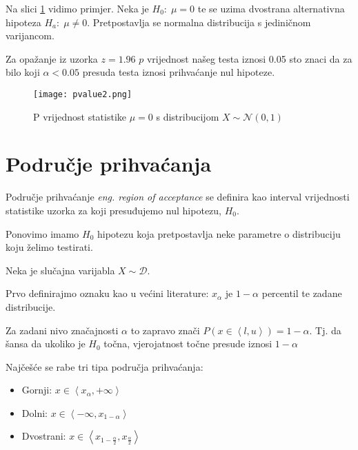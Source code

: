 Na slici \ref{fig:pvalue2} vidimo primjer. Neka je $H_0: \; \mu = 0$ te se uzima dvostrana alternativna hipoteza $H_a: \; \mu \ne 0$. Pretpostavlja se normalna distribucija s jediničnom varijancom.

Za opažanje iz uzorka $z = 1.96$ $p$ vrijednost našeg testa iznosi 0.05 sto znaci da za bilo koji $\alpha < 0.05$ presuda testa iznosi prihvaćanje nul hipoteze.

\begin{figure}[ph]
    \centering
    \texttt{[image: pvalue2.png]}
    \caption{P vrijednost statistike $\mu = 0$ s distribucijom $X \sim \mathcal{N}(0,1)$}
	\label{fig:pvalue2}
\end{figure}


\section{Područje prihvaćanja}

Područje prihvaćanje \textit{eng. region of acceptance} se definira kao interval vrijednosti statistike uzorka za koji presuđujemo nul hipotezu, $H_0$. \cite{acceptance}

Ponovimo imamo $H_0$ hipotezu koja pretpostavlja neke parametre o distribuciju koju želimo testirati. \cite{vis3} 

Neka je slučajna varijabla $X \sim \mathcal{D}$.

Prvo definirajmo oznaku kao u većini literature:
$x_\alpha$ je $1-\alpha$ percentil te zadane distribucije. \cite{vis3} \cite{engstat} 

Za zadani nivo značajnosti $\alpha$ to zapravo znači  $P(x \in \left<l, u\right>) = 1-\alpha$. Tj. da šansa da ukoliko je $H_0$ točna, vjerojatnost točne presude iznosi $1-\alpha$

Najčešće se rabe tri tipa područja prihvaćanja:

\begin{itemize}
	\item Gornji: $x \in \left< x_\alpha, +\infty \right>$
	\item Dolni: $x \in \left<-\infty, x_{1-\alpha} \right>$
	\item Dvostrani: $x \in \left<x_{1-\frac{\alpha}{2}}, x_{\frac{\alpha}{2}} \right>$
\end{itemize}
